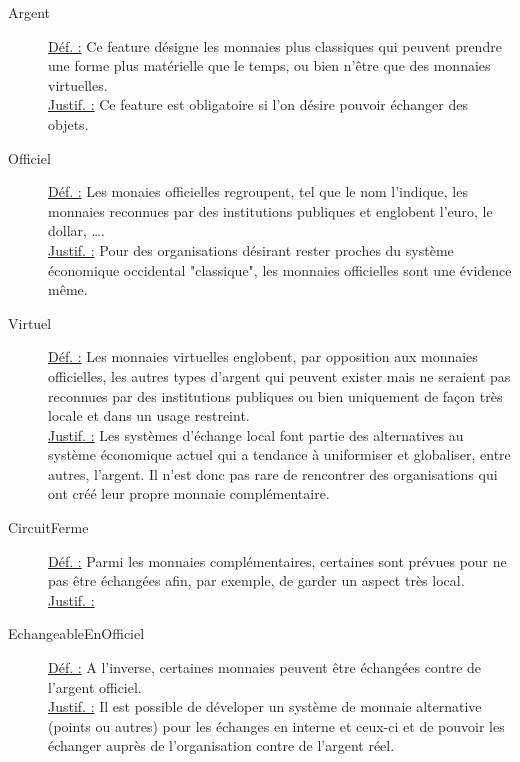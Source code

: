 \begin{description}
\item [Argent]
\underline{Déf. :}  Ce feature désigne les monnaies plus classiques qui peuvent prendre une forme plus matérielle que le temps,  ou bien n'être que des monnaies virtuelles.
\\ \underline{Justif. :}  Ce feature est obligatoire si l'on désire pouvoir échanger des objets.  
\newline

\item [Officiel]
\underline{Déf. :}  Les monaies officielles regroupent,  tel que le nom l'indique,  les monnaies reconnues par des institutions publiques et englobent l'euro,  le dollar,  \dots.  
\\ \underline{Justif. :}  Pour des organisations désirant rester proches du système économique occidental "classique",  les monnaies officielles sont une évidence même.
\newline

\item [Virtuel]
\underline{Déf. :}  Les monnaies virtuelles englobent,  par opposition aux monnaies officielles,  les autres types d'argent qui peuvent exister mais ne seraient pas reconnues par des institutions publiques ou bien uniquement de façon très locale et dans un usage restreint.
\\ \underline{Justif. :}  Les systèmes d'échange local font partie des alternatives au système économique actuel qui a tendance à uniformiser et globaliser,  entre autres,  l'argent.  Il n'est donc pas rare de rencontrer des organisations qui ont créé leur propre monnaie complémentaire.  
\newline

\item [CircuitFerme]
\underline{Déf. :}  Parmi les monnaies complémentaires,  certaines sont prévues pour ne pas être échangées afin,  par exemple,  de garder un aspect très local.  
\\ \underline{Justif. :}  
\newline

\item [EchangeableEnOfficiel]
\underline{Déf. :}  A l'inverse,  certaines monnaies peuvent être échangées contre de l'argent officiel.
\\ \underline{Justif. :}  Il est possible de déveloper un système de monnaie alternative (points ou autres) pour les échanges en interne et ceux-ci et de pouvoir les échanger auprès de l'organisation contre de l'argent réel.
\newline


\end{description}

